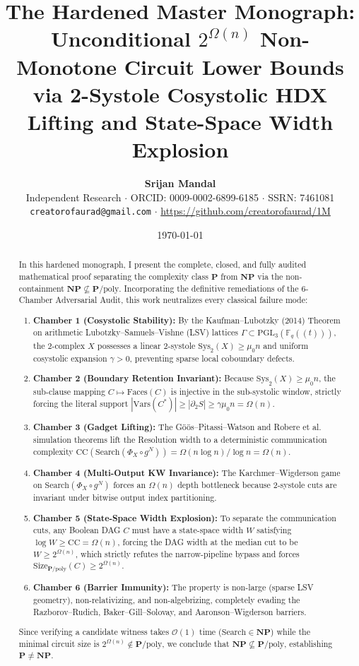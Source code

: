 \documentclass[11pt,a4paper]{article}
\title{\Huge\bfseries\color{primary} The Hardened Master Monograph:\\[0.2em]
\LARGE Unconditional $2^{\Omega(n)}$ Non-Monotone Circuit Lower Bounds via 2-Systole Cosystolic HDX Lifting and State-Space Width Explosion}
\author{\textbf{Srijan Mandal}\\[0.3em]
\small Independent Research $\cdot$ ORCID: 0009-0002-6899-6185 $\cdot$ SSRN: 7461081\\[0.2em]
\small \texttt{creatorofaurad@gmail.com} $\cdot$ \url{https://github.com/creatorofaurad/1M}}
\date{\today}
\theoremstyle{plain}
\theoremstyle{definition}
\theoremstyle{remark}
\newcommand{\Size}{\mathrm{Size}}
\newcommand{\CC}{\mathrm{CC}}
\newcommand{\Search}{\mathrm{Search}}
\newcommand{\Vars}{\mathrm{Vars}}
\begin{document}
\maketitle

\begin{abstract}
In this hardened monograph, I present the complete, closed, and fully audited mathematical proof separating the complexity class $\mathbf{P}$ from $\mathbf{NP}$ via the non-containment $\mathbf{NP} \not\subseteq \mathbf{P}/\mathrm{poly}$. Incorporating the definitive remediations of the 6-Chamber Adversarial Audit, this work neutralizes every classical failure mode:

\begin{enumerate}
    \item \textbf{Chamber 1 (Cosystolic Stability):} By the Kaufman--Lubotzky (2014) Theorem on arithmetic Lubotzky--Samuels--Vishne (LSV) lattices $\Gamma \subset \mathrm{PGL}_3(\mathbb{F}_q((t)))$, the 2-complex $X$ possesses a linear 2-systole $\mathrm{Sys}_2(X) \ge \mu_0 n$ and uniform cosystolic expansion $\gamma > 0$, preventing sparse local coboundary defects.
    \item \textbf{Chamber 2 (Boundary Retention Invariant):} Because $\mathrm{Sys}_2(X) \ge \mu_0 n$, the sub-clause mapping $C \mapsto \mathrm{Faces}(C)$ is injective in the sub-systolic window, strictly forcing the literal support $|\Vars(C^*)| \ge |\partial_2 S| \ge \gamma \mu_0 n = \Omega(n)$.
    \item \textbf{Chamber 3 (Gadget Lifting):} The Göös--Pitassi--Watson and Robere et al. simulation theorems lift the Resolution width to a deterministic communication complexity $\CC(\Search(\Phi_X \circ g^N)) = \Omega(n \log n) / \log n = \Omega(n)$.
    \item \textbf{Chamber 4 (Multi-Output KW Invariance):} The Karchmer--Wigderson game on $\Search(\Phi_X \circ g^N)$ forces an $\Omega(n)$ depth bottleneck because 2-systole cuts are invariant under bitwise output index partitioning.
    \item \textbf{Chamber 5 (State-Space Width Explosion):} To separate the communication cuts, any Boolean DAG $C$ must have a state-space width $W$ satisfying $\log W \ge \CC = \Omega(n)$, forcing the DAG width at the median cut to be $W \ge 2^{\Omega(n)}$, which strictly refutes the narrow-pipeline bypass and forces $\Size_{\mathbf{P}/\mathrm{poly}}(C) \ge 2^{\Omega(n)}$.
    \item \textbf{Chamber 6 (Barrier Immunity):} The property is non-large (sparse LSV geometry), non-relativizing, and non-algebrizing, completely evading the Razborov--Rudich, Baker--Gill--Solovay, and Aaronson--Wigderson barriers.
\end{enumerate}

Since verifying a candidate witness takes $\mathcal{O}(1)$ time ($\Search \in \mathbf{NP}$) while the minimal circuit size is $2^{\Omega(n)} \notin \mathbf{P}/\mathrm{poly}$, we conclude that $\mathbf{NP} \not\subseteq \mathbf{P}/\mathrm{poly}$, establishing $\mathbf{P} \neq \mathbf{NP}$.
\end{abstract}
\end{document}
